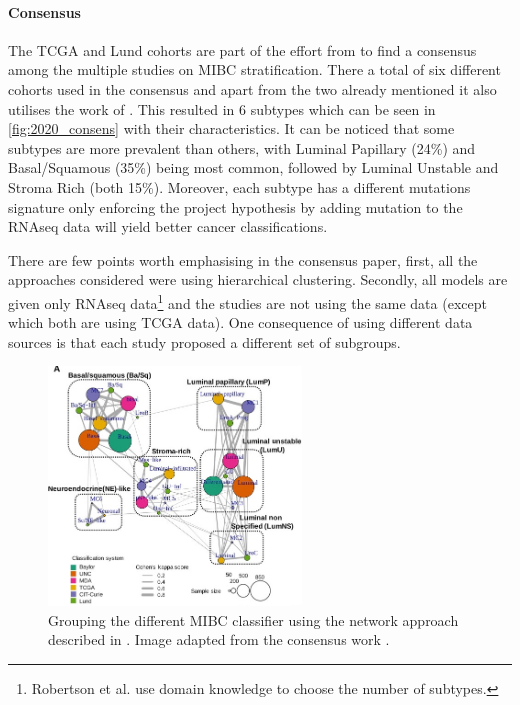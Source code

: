 \paragraph*{Consensus} \label{s:lit:consensus_mibc}

The TCGA and Lund cohorts are part of the effort from \citet{Kamoun2020-tj} to find a consensus among the multiple studies on MIBC stratification. There a total of six different cohorts used in the consensus and apart from the two already mentioned \citet{Kamoun2020-tj} it also utilises the work of \citet{Mo2018-rl, Damrauer2014-tc, Choi2014-ed, Rebouissou2014-ep}. This resulted in 6 subtypes which can be seen in \cref{fig:2020_consens} with their characteristics. It can be noticed that some subtypes are more prevalent than others, with Luminal Papillary (24\%) and Basal/Squamous (35\%) being most common, followed by Luminal Unstable and Stroma Rich (both 15\%). Moreover, each subtype has a different mutations signature only enforcing the project hypothesis by adding mutation to the RNAseq data will yield better cancer classifications.

There are few points worth emphasising in the consensus paper, first, all the approaches\cite{Mo2018-rl, Damrauer2014-tc, Choi2014-ed, Marzouka2018-ge, Rebouissou2014-ep,Robertson2017-mg} considered were using hierarchical clustering. Secondly, all models are given only RNAseq data\footnote{Robertson et al. use domain knowledge to choose the number of subtypes.} and the studies are not using the same data (except \cite{Robertson2017-mg, Mo2018-rl} which both are using TCGA data). One consequence of using different data sources is that each study proposed a different set of subgroups. 

\begin{figure}[!htb]    
    \centering
\includegraphics[width=0.6\textwidth,height=0.6\textheight,keepaspectratio]{Sections/Lit_review/Resources/consensus_network_classifier.jpg}
    \caption{Grouping the different MIBC classifier using the network approach described in \citet{Guinney2015-fy}. Image adapted from the consensus work \citet{Kamoun2020-tj}.}
    \label{fig:lit:consensus_network}
\end{figure}


